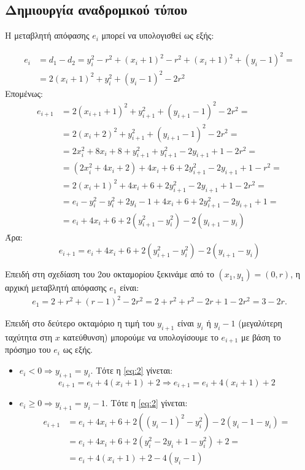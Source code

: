 \subsection{Δημιουργία αναδρομικού τύπου}

Η μεταβλητή απόφασης $e_i$ μπορεί να υπολογισθεί ως εξής: 

\begin{align*}
	e_i &= d_1 - d_2 = 
		  y_i^2 - r^2 + (x_i +1)^2 - r^2 + (x_i +1)^2 + (y_i-1)^2 =  \\ 
		&=  2(x_i +1)^2 + y_i^2 + (y_i -1)^2 -2r^2	
\end{align*}
%
Επομένως:
%
\begin{align*}
	e_{i+1} &= 2(x_{i+1} + 1)^2 + y_{i+1}^2 + (y_{i+1}-1)^2 - 2r^2 = \\
			 &= 2(x_i +2)^2 + y_{i+1}^2 + (y_{i+1} -1)^2 - 2r^2 = \\
			 &= 2x_i^2 + 8x_i + 8 + y_{i+1}^2 + y_{i+1}^2 -2y_{i+1} + 1 -2r^2 = \\
			 &= (2x_i^2 + 4x_i +2) + 4x_i + 6 + 2y_{i+1}^2 -2y_{i+1} +1-r^2 = \\
			 &= 2(x_i +1)^2 + 4x_i + 6 + 2y_{i+1}^2 - 2y_{i+1} + 1 -2r^2 = \\
			 &= e_i - y_i^2 - y_i^2 + 2y_i -1 + 4x_i + 6 + 2y_{i+1}^2 -2y_{i+1} + 1 = \\
			 &=  e_i + 4x_i + 6 + 2(y_{i+1}^2 - y_i^2) -2(y_{i+1} - y_i)
\end{align*}
%
Άρα:
%
\begin{equation}
	e_{i+1} = e_i + 4x_i + 6 + 2(y_{i+1}^2 - y_i^2) -2(y_{i+1}-y_i)
	\label{eq:2}
\end{equation}


Επειδή στη σχεδίαση του $2$ου οκταμορίου ξεκινάμε από το $(x_1, y_1) = (0,r)$, η αρχική μεταβλητή απόφασης $e_1$ είναι:
%
\begin{align*}
	e_1 = 2+r^2 + (r-1)^2 - 2r^2 = 
		2+r^2 + r^2 -2r+1-2r^2 = 
		3-2r.
\end{align*}

Επειδή στο δεύτερο οκταμόριο η τιμή του $y_{i+1}$ είναι $y_i$ ή $y_i -1$ (μεγαλύτερη ταχύτητα στη $x$ κατεύθυνση) μπορούμε να υπολογίσουμε το $e_{i+1}$ με βάση το πρόσημο του $e_i$ ως εξής.

\begin{itemize}
  \item $e_i < 0 \Rightarrow y_{i+1} = y_i$. Τότε η \eqref{eq:2} γίνεται:
  \[
	   e_{i+1} = e_i + 4(x_i +1) + 2 \Rightarrow e_{i+1} = e_i + 4(x_i + 1) + 2
   \]
   \item $e_i \geq 0 \Rightarrow y_{i+1} = y_i - 1$. Τότε η \eqref{eq:2} γίνεται:
   \begin{align*}
   	e_{i+1} &= e_i + 4x_i  + 6 + 2( (y_i -1)^2 - y_i^2 ) - 2(y_i -1 -y_i) =  \\
   			&= e_i + 4x_i + 6 + 2(y_i^2 -2y_i + 1 -y_i^2) + 2 = \\ 
 			&= e_i + 4(x_i + 1) + 2 -4(y_i -1)
   \end{align*}
   
\end{itemize}

